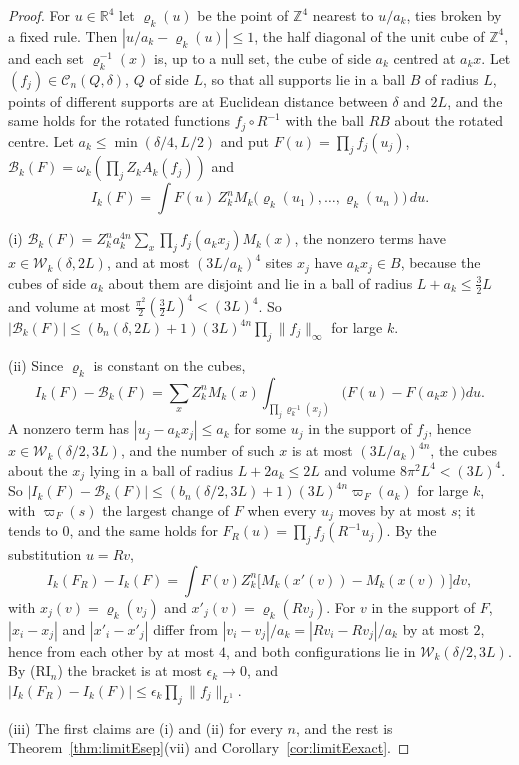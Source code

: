 \documentclass[aps,prd,twocolumn,superscriptaddress,nofootinbib,longbibliography,floatfix,amsmath,amssymb,10pt]{revtex4-2}
\theoremstyle{definition}
\theoremstyle{remark}
\newcommand{\R}{\mathbb{R}}
\newcommand{\Z}{\mathbb{Z}}
\begin{document}
\begin{proof}
For $u\in\R^4$ let $\varrho_k(u)$ be the point of $\Z^4$ nearest to
$u/a_k$, ties broken by a fixed rule. Then $|u/a_k-\varrho_k(u)|\le1$, the
half diagonal of the unit cube of $\Z^4$, and each set
$\varrho_k^{-1}(x)$ is, up to a null set, the cube of side $a_k$ centred at
$a_kx$. Let $(f_j)\in\mathcal C_n(Q,\delta)$, $Q$ of side $L$, so that all
supports lie in a ball $B$ of radius $L$, points of different supports are
at Euclidean distance between $\delta$ and $2L$, and the same holds for the
rotated functions $f_j\circ R^{-1}$ with the ball $RB$ about the rotated
centre. Let $a_k\le\min(\delta/4,L/2)$ and put $F(u)=\prod_jf_j(u_j)$,
$\mathcal B_k(F)=\omega_k(\prod_jZ_kA_k(f_j))$ and
\[
I_k(F)=\int F(u)\,Z_k^nM_k\bigl(\varrho_k(u_1),\dots,\varrho_k(u_n)\bigr)
\,du .
\]

(i) $\mathcal B_k(F)=Z_k^na_k^{4n}\sum_x\prod_jf_j(a_kx_j)M_k(x)$, the nonzero terms
have $x\in\mathcal W_k(\delta,2L)$, and at most $(3L/a_k)^4$ sites $x_j$
have $a_kx_j\in B$, because the cubes of side $a_k$ about them are disjoint
and lie in a ball of radius $L+a_k\le\frac32L$ and volume at most
$\frac{\pi^2}2(\frac32L)^4<(3L)^4$. So $|\mathcal B_k(F)|\le(b_n(\delta,2L)+1)(3L)^{4n}
\prod_j\|f_j\|_\infty$ for large $k$.

(ii) Since $\varrho_k$ is constant on the cubes,
\[
I_k(F)-\mathcal B_k(F)=\sum_xZ_k^nM_k(x)\int_{\prod_j\varrho_k^{-1}(x_j)}
\bigl(F(u)-F(a_kx)\bigr)du .
\]
A nonzero term has $|u_j-a_kx_j|\le a_k$ for some $u_j$ in the support of
$f_j$, hence $x\in\mathcal W_k(\delta/2,3L)$, and the number of such $x$
is at most $(3L/a_k)^{4n}$, the cubes about the $x_j$ lying in a ball of
radius $L+2a_k\le2L$ and volume $8\pi^2L^4<(3L)^4$. So $|I_k(F)-\mathcal B_k(F)|\le(b_n(\delta/2,3L)+1)
(3L)^{4n}\varpi_F(a_k)$ for large $k$, with $\varpi_F(s)$ the largest
change of $F$ when every $u_j$ moves by at most $s$; it tends to $0$, and
the same holds for $F_R(u)=\prod_jf_j(R^{-1}u_j)$. By the substitution
$u=Rv$,
\[
I_k(F_R)-I_k(F)=\int F(v)Z_k^n\bigl[M_k(x'(v))-M_k(x(v))\bigr]dv,
\]
with $x_j(v)=\varrho_k(v_j)$ and $x'_j(v)=\varrho_k(Rv_j)$. For $v$ in the
support of $F$, $|x_i-x_j|$ and $|x'_i-x'_j|$ differ from $|v_i-v_j|/a_k=
|Rv_i-Rv_j|/a_k$ by at most $2$, hence from each other by at most $4$, and
both configurations lie in $\mathcal W_k(\delta/2,3L)$. By
(RI$_n$) the bracket is at most $\epsilon_k\to0$, and $|I_k(F_R)-I_k(F)|\le
\epsilon_k\prod_j\|f_j\|_{L^1}$.

(iii) The first claims are (i) and (ii) for every $n$, and the rest is
Theorem~\ref{thm:limitEsep}(vii) and Corollary~\ref{cor:limitEexact}.


\end{proof}
\end{document}
